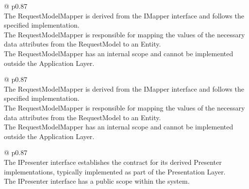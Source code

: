 \begin{table}[H]
    \begin{tabular}{@{\makebox[2em][c]{\rownumber\space}}  p{0.87\linewidth}}
        \\ 
    \hline
    The RequestModelMapper is derived from the IMapper interface and follows the specified
    implementation. \\

    The RequestModelMapper is responsible for mapping the values of the necessary data
    attributes from the RequestModel to an Entity. \\
    
    The RequestModelMapper has an internal scope and cannot be implemented outside
    the Application Layer. \\
    \hline
    \end{tabular}
\caption{RequestModelMapper Requirements}
\label{table_requirements_requestmodelmapper}
\end{table}

\begin{table}[H]
    \begin{tabular}{@{\makebox[2em][c]{\rownumber\space}}  p{0.87\linewidth}}
        \\ 
    \hline
    The RequestModelMapper is derived from the IMapper interface and follows the specified
    implementation. \\

    The RequestModelMapper is responsible for mapping the values of the necessary data
    attributes from the RequestModel to an Entity. \\
    
    The RequestModelMapper has an internal scope and cannot be implemented outside the
    Application Layer. \\
       \hline
    \end{tabular}
\caption{ResponseModelMapper Requirements}
\label{table_requirements_responsemodelmapper}
\end{table}

\begin{table}[H]
    \begin{tabular}{@{\makebox[2em][c]{\rownumber\space}}  p{0.87\linewidth}}
        \\ 
    \hline
    The IPresenter interface establishes the contract for its derived Presenter
    implementations, typically implemented as part of the Presentation Layer. \\

    The IPresenter interface has a public scope within the system. \\
    \hline
    \end{tabular}
\caption{IPresenter Requirements}
\label{table_requirements_ipresenter}
\end{table}

